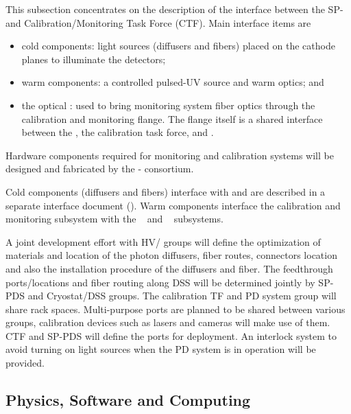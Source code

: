 This subsection concentrates on the description of the interface between the SP- and Calibration/Monitoring Task Force (CTF).
Main interface items are
\begin{itemize}
    \item cold components: light sources (diffusers and fibers) placed on the cathode planes to illuminate the detectors;
    \item warm components: a controlled pulsed-UV source and warm optics; and 
 
    \item the optical \fdth: used to  bring monitoring system fiber optics through the calibration and monitoring flange.  The flange itself is a shared interface between the , the calibration task force, and .
\end{itemize}

Hardware components required for  monitoring and calibration systems will be designed and fabricated by the - consortium. 

Cold components (diffusers and fibers) interface with  and are described in a separate interface document (). Warm components interface the  calibration and monitoring subsystem with the ~ and ~ subsystems.

A joint development effort with HV/ groups will define the optimization of materials and location of the photon diffusers, fiber routes, connectors location and also the installation procedure of the diffusers and fiber. The feedthrough ports/locations and fiber routing along DSS will be determined jointly by SP-PDS and Cryostat/DSS groups. The calibration TF and PD system group will share rack spaces. Multi-purpose ports are planned to be shared between various groups, calibration devices such as lasers and cameras will make use of them. CTF and SP-PDS will define the ports for deployment. An interlock system to avoid turning on light sources when the PD system is in operation will be provided.

\subsection{Physics, Software and Computing}


